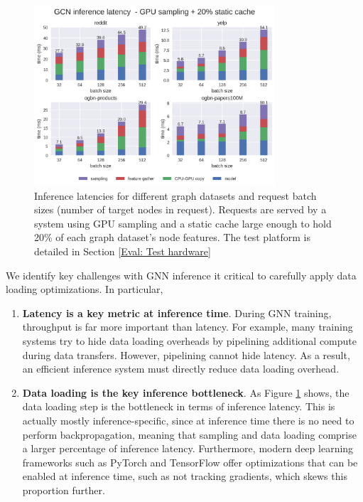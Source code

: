 \begin{figure}[h!]
    \centering
    \includegraphics[width=0.8\textwidth]{figures/GCN_latency_breakdown_gpu_sampled_with_cache.png}
    
    \caption{Inference latencies for different graph datasets and request batch sizes (number of target nodes in request). Requests are served by a system using GPU sampling and a static cache large enough to hold 20\% of each graph dataset's node features. The test platform is detailed in Section \ref{Eval: Test hardware}}
    \label{GPU Sampling Latency Breakdown}
\end{figure}    

We identify key challenges with GNN inference it critical to carefully apply data loading optimizations. In particular,

\begin{enumerate}
    \item \textbf{Latency is a key metric at inference time}. During GNN training, throughput is far more important than latency. For example, many training systems try to hide data loading overheads by pipelining additional compute during data transfers. However, pipelining cannot hide latency. As a result, an efficient inference system must directly reduce data loading overhead.
    \item \textbf{Data loading is the key inference bottleneck}. As Figure \ref{GPU Sampling Latency Breakdown} shows, the data loading step is the bottleneck in terms of inference latency. This is actually mostly inference-specific, since at inference time there is no need to perform backpropagation, meaning that sampling and data loading comprise a larger percentage of inference latency. Furthermore, modern deep learning frameworks such as PyTorch \cite{PyTorch_2019} and TensorFlow \cite{tensorflow2015-whitepaper} offer optimizations that can be enabled at inference time, such as not tracking gradients, which skews this proportion further.
\end{enumerate}

